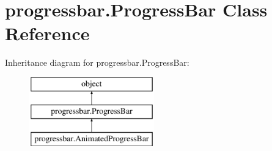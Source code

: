 \hypertarget{classprogressbar_1_1ProgressBar}{}\section{progressbar.\+Progress\+Bar Class Reference}
\label{classprogressbar_1_1ProgressBar}
Inheritance diagram for progressbar.\+Progress\+Bar\+:\begin{figure}[H]
\begin{center}
\leavevmode
\includegraphics[height=3.000000cm]{classprogressbar_1_1ProgressBar}
\end{center}
\end{figure}
